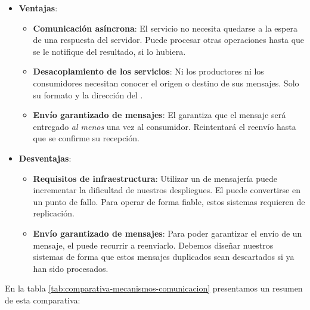 \begin{itemize}
  \item \textbf{Ventajas}:

  \begin{itemize}
    \item \textbf{Comunicación asíncrona}: El servicio no necesita quedarse a la espera de una respuesta del servidor. Puede procesar otras operaciones hasta que se le notifique del resultado, si lo hubiera.

    \item \textbf{Desacoplamiento de los servicios}: Ni los productores ni los consumidores necesitan conocer el origen o destino de sus mensajes. Solo su formato y la dirección del .

    \item \textbf{Envío garantizado de mensajes}: El  garantiza que el mensaje será entregado \emph{al menos} una vez al consumidor. Reintentará el reenvío hasta que se confirme su recepción.

  \end{itemize}

  \item \textbf{Desventajas}:

  \begin{itemize}
    \item \textbf{Requisitos de infraestructura}: Utilizar un  de mensajería puede incrementar la dificultad de nuestros despliegues. El  puede convertirse en un punto de fallo. Para operar de forma fiable, estos sistemas requieren de replicación. \cite{newmanBuildingMicroservicesDesigning2021}

    \item \textbf{Envío garantizado de mensajes}: Para poder garantizar el envío de un mensaje, el  puede recurrir a reenviarlo. Debemos diseñar nuestros sistemas de forma que estos mensajes duplicados sean descartados si ya han sido procesados.
  \end{itemize}
\end{itemize}

En la tabla \ref{tab:comparativa-mecanismos-comunicacion} presentamos un resumen de esta comparativa:

